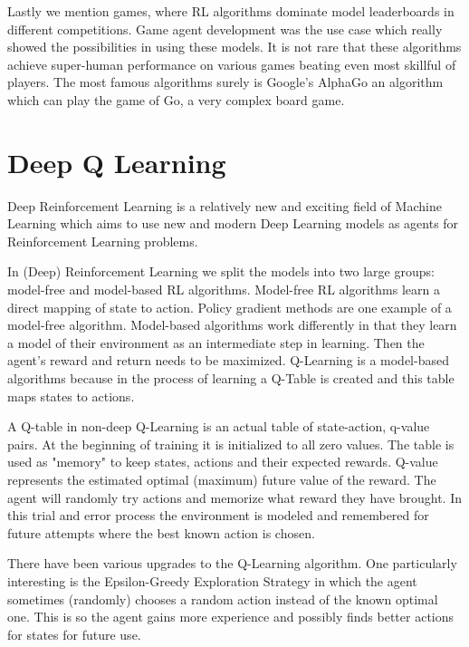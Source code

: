 \documentclass[b5paper]{book}
\begin{document}
Lastly we mention games, where RL algorithms dominate model leaderboards in different competitions. Game agent development was the use case which really showed the possibilities in using these models. It is not rare that these algorithms achieve super-human performance on various games beating even most skillful of players. The most famous algorithms surely is Google's AlphaGo an algorithm which can play the game of Go, a very complex board game.

\section{Deep Q Learning}



Deep Reinforcement Learning is a relatively new and exciting field of Machine Learning which aims to use new and modern Deep Learning models as agents for Reinforcement Learning problems.

In (Deep) Reinforcement Learning we split the models into two large groups: model-free and model-based RL algorithms. Model-free RL algorithms learn a direct mapping of state to action. Policy gradient methods are one example of a model-free algorithm. Model-based algorithms work differently in that they learn a model of their environment as an intermediate step in learning. Then the agent's reward and return needs to be maximized. Q-Learning is a model-based algorithms because in the process of learning a Q-Table is created and this table maps states to actions.

A Q-table in non-deep Q-Learning is an actual table of state-action, q-value pairs. At the beginning of training it is initialized to all zero values. The table is used as "memory" to keep states, actions and their expected rewards. Q-value represents the estimated optimal (maximum) future value of the reward. The agent will randomly try actions and memorize what reward they have brought. In this trial and error process the environment is modeled and remembered for future attempts where the best known action is chosen.

There have been various upgrades to the Q-Learning algorithm. One particularly interesting is the Epsilon-Greedy Exploration Strategy in which the agent sometimes (randomly) chooses a random action instead of the known optimal one. This is so the agent gains more experience and possibly finds better actions for states for future use.
\end{document}
